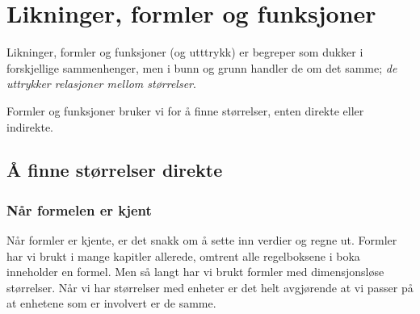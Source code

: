 



\section{Likninger, formler og funksjoner}
Likninger, formler og funksjoner (og utttrykk) er begreper som dukker i forskjellige sammenhenger, men i bunn og grunn handler de om det samme; \textsl{de uttrykker relasjoner mellom størrelser}.\vsk

Formler og funksjoner bruker vi for å finne størrelser, enten direkte eller indirekte.

\subsection{Å finne størrelser direkte}
\subsubsection{Når formelen er kjent}
Når formler er kjente, er det snakk om å sette inn verdier og regne ut. Formler har vi brukt i mange kapitler allerede, omtrent alle regelboksene i boka inneholder en formel. 
Men så langt har vi brukt formler med dimensjonsløse størrelser. Når vi har størrelser med enheter er det helt avgjørende at vi passer på at enhetene som er involvert er de samme.

\regv

